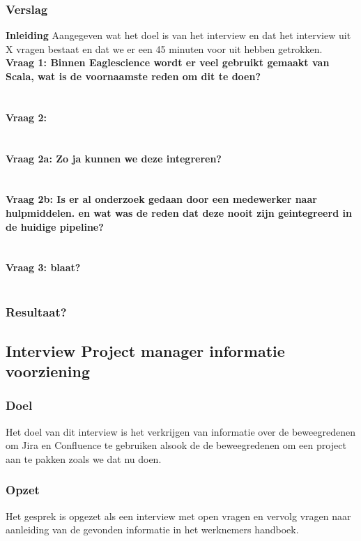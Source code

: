 \subsubsection{Verslag}
\textbf{Inleiding}
Aangegeven wat het doel is van het interview en dat het interview uit X vragen bestaat en dat we er een 45 minuten voor uit hebben getrokken.\\
\textbf{Vraag 1: Binnen Eaglescience wordt er veel gebruikt gemaakt van Scala, wat is de voornaamste reden om dit te doen?}\\
\lipsum[01]\\
\\
\textbf{Vraag 2:}\\
\lipsum[02]\\
\\
\textbf{Vraag 2a: Zo ja kunnen we deze integreren?}\\
\lipsum[03]\\
\\
\textbf{Vraag 2b: Is er al onderzoek gedaan door een medewerker naar hulpmiddelen. en wat was de reden dat deze nooit zijn geintegreerd in de huidige pipeline?}\\
\lipsum[04]\\
\\
\textbf{Vraag 3: blaat?}\\
\lipsum[05]\\

\subsubsection{Resultaat?}

\subsection{Interview Project manager informatie voorziening }
\subsubsection{Doel}
Het doel van dit interview is het verkrijgen van informatie over de beweegredenen om Jira en Confluence te gebruiken alsook de de beweegredenen om een project aan te pakken zoals we dat nu doen.
\subsubsection{Opzet}
Het gesprek is opgezet als een interview met open vragen en vervolg vragen naar aanleiding van de gevonden informatie in het werknemers handboek.
